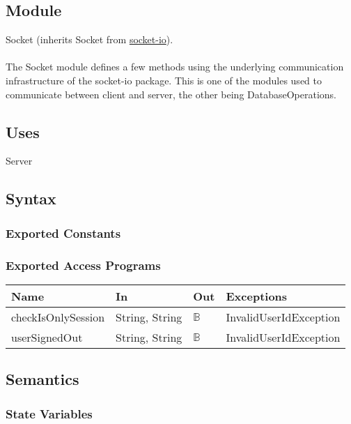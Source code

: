 \documentclass[12pt, titlepage]{article}
\begin{document}
\subsection{Module}

Socket (inherits Socket from \href{https://socket.io/docs/v4/client-socket-instance/}{socket-io}).\\ \\
The Socket module defines a few methods using the underlying communication infrastructure of the socket-io package. This is one of the modules used to communicate between client and server, the other being DatabaseOperations.

\subsection{Uses}

Server

\subsection{Syntax}

\subsubsection{Exported Constants}

\subsubsection{Exported Access Programs}

\begin{center}
\begin{tabular}{p{4cm} p{4cm} p{4cm} p{2cm}}
\hline
\textbf{Name} & \textbf{In} & \textbf{Out} & \textbf{Exceptions} \\
\hline
checkIsOnlySession & String, String & $\mathbb{B}$ & InvalidUserIdException \\ \hline
userSignedOut & String, String & $\mathbb{B}$ & InvalidUserIdException \\
\hline
\end{tabular}
\end{center}

\subsection{Semantics}

\subsubsection{State Variables}
\end{document}
